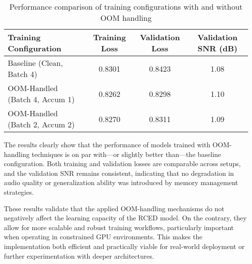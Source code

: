 \vspace{1em}
\begin{table}[H]
\centering
\caption{Performance comparison of training configurations with and without OOM handling}
\label{tab:oom_justification_results}
\begin{tabular}{|l|c|c|c|}
\hline
\textbf{Training Configuration} & \textbf{Training Loss} & \textbf{Validation Loss} & \textbf{Validation SNR (dB)} \\
\hline
Baseline (Clean, Batch 4)            & 0.8301 & 0.8423 & 1.08 \\
OOM-Handled (Batch 4, Accum 1)       & 0.8262 & 0.8298 & 1.10 \\
OOM-Handled (Batch 2, Accum 2)       & 0.8270 & 0.8311 & 1.09 \\
\hline
\end{tabular}
\end{table}

The results clearly show that the performance of models trained with OOM-handling techniques is on par with—or slightly better than—the baseline configuration. Both training and validation losses are comparable across setups, and the validation SNR remains consistent, indicating that no degradation in audio quality or generalization ability was introduced by memory management strategies.

These results validate that the applied OOM-handling mechanisms do not negatively affect the learning capacity of the RCED model. On the contrary, they allow for more scalable and robust training workflows, particularly important when operating in constrained GPU environments. This makes the implementation both efficient and practically viable for real-world deployment or further experimentation with deeper architectures.

